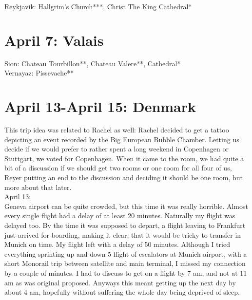 Reykjavik: Hallgrim's Church***, Christ The King Cathedral*

\section{April 7: Valais}
\label{Valais2018}

Sion: Chateau Tourbillon**, Chateau Valere**, Cathedral*\\
Vernayaz: Pissevache**

\section{April 13-April 15: Denmark}
\label{2018:Denmark}

This trip idea was related to Rachel as well: Rachel decided to get a tattoo depicting an event recorded by the Big European Bubble Chamber. Letting us decide if we would prefer to rather spent a long weekend in Copenhagen or Stuttgart, we voted for Copenhagen. When it came to the room, we had quite a bit of a discussion if we should get two rooms or one room for all four of us, Reyer putting an end to the discussion and deciding it should be one room, but more about that later.\\

April 13:\\
Geneva airport can be quite crowded, but this time it was really horrible. Almost every single flight had a delay of at least 20 minutes. Naturally my flight was delayed too. By the time it was supposed to depart, a flight leaving to Frankfurt just arrived for boarding, making it clear, that it would be tricky to transfer in Munich on time. My flight left with a delay of 50 minutes. Although I tried everything sprinting up and down 5 flight of escalators at Munich airport, with a short Monorail trip between satellite and main terminal, I missed my connection by a couple of minutes. I had to discuss to get on a flight by 7 am, and not at 11 am as was original proposed. Anyways this meant getting up the next day by about 4 am, hopefully without suffering the whole day being deprived of sleep.\\

